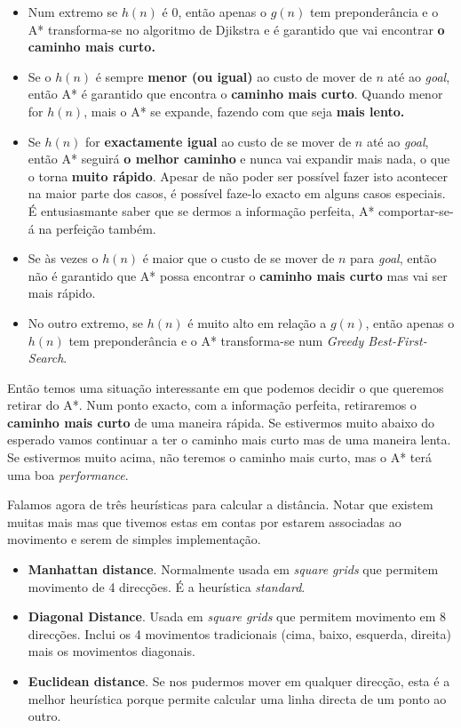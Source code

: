 \documentclass[a4paper]{article}
\begin{document}
\begin{itemize}
    \item Num extremo se $h(n)$ é 0, então apenas o $g(n)$ tem preponderância e o A* transforma-se no algoritmo de Djikstra e é garantido que vai encontrar \textbf{o caminho mais curto.}
    \item Se o $h(n)$ é sempre \textbf{menor (ou igual)} ao custo de mover de $n$ até ao \textit{goal}, então A* é garantido que encontra o \textbf{caminho mais curto}. Quando menor for $h(n)$, mais o A* se expande, fazendo com que seja \textbf{mais lento.}
    \item Se $h(n)$ for \textbf{exactamente igual} ao custo de se mover de $n$ até ao \textit{goal}, então A* seguirá \textbf{o melhor caminho} e nunca vai expandir mais nada, o que o torna \textbf{muito rápido}. Apesar de não poder ser possível fazer isto acontecer na maior parte dos casos, é possível faze-lo exacto em alguns casos especiais. É entusiasmante saber que se dermos a informação perfeita, A* comportar-se-á na perfeição também.
    \item Se às vezes o $h(n)$ é maior que o custo de se mover de $n$ para \textit{goal}, então não é garantido que A* possa encontrar o \textbf{caminho mais curto} mas vai ser mais rápido.
    \item No outro extremo, se $h(n)$ é muito alto em relação a $g(n)$, então apenas o $h(n)$ tem preponderância e o A* transforma-se num \textit{Greedy Best-First-Search}.
\end{itemize}

Então temos uma situação interessante em que podemos decidir o que queremos retirar do A*. Num ponto exacto, com a informação perfeita, retiraremos o \textbf{caminho mais curto} de uma maneira rápida. Se estivermos muito abaixo do esperado vamos continuar a ter o caminho mais curto mas de uma maneira lenta. Se estivermos muito acima, não teremos o caminho mais curto, mas o A* terá uma boa \textit{performance}.

Falamos agora de três heurísticas para calcular a distância. Notar que existem muitas mais mas que tivemos estas em contas por estarem associadas ao movimento e serem de simples implementação.

\begin{itemize}
    \item \textbf{Manhattan distance}. Normalmente usada em \textit{square grids} que permitem movimento de 4 direcções. É a heurística \textit{standard}.
    \item \textbf{Diagonal Distance}. Usada em \textit{square grids} que permitem movimento em 8 direcções. Inclui os 4 movimentos tradicionais (cima, baixo, esquerda, direita) mais os movimentos diagonais.
    \item \textbf{Euclidean distance}. Se nos pudermos mover em qualquer direcção, esta é a melhor heurística porque permite calcular uma linha directa de um ponto ao outro.
\end{itemize}
\end{document}
